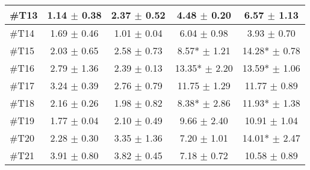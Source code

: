 \begin{longtable} {l|c|c|c|c}
\#T13 & 1.14 $\pm$ 0.38 & 2.37 $\pm$ 0.52 & 4.48 $\pm$ 0.20 & 6.57 $\pm$ 1.13 \\ \hline
\#T14 & 1.69 $\pm$ 0.46 & 1.01 $\pm$ 0.04 & 6.04 $\pm$ 0.98 & 3.93 $\pm$ 0.70 \\ \hline
\#T15 & 2.03 $\pm$ 0.65 & 2.58 $\pm$ 0.73  & 8.57* $\pm$ 1.21 & 14.28* $\pm$ 0.78 \\ \hline
\#T16 & 2.79 $\pm$ 1.36 & 2.39 $\pm$ 0.13 & 13.35* $\pm$ 2.20 & 13.59* $\pm$ 1.06 \\ \hline
\#T17 & 3.24 $\pm$ 0.39  & 2.76 $\pm$ 0.79   & 11.75 $\pm$ 1.29 & 11.77 $\pm$ 0.89 \\ \hline
\#T18 & 2.16 $\pm$ 0.26 & 1.98  $\pm$ 0.82 & 8.38* $\pm$ 2.86 & 11.93* $\pm$ 1.38 \\ \hline
\#T19 & 1.77 $\pm$ 0.04 & 2.10 $\pm$ 0.49 & 9.66 $\pm$ 2.40 & 10.91  $\pm$ 1.04 \\ \hline
\#T20 & 2.28 $\pm$ 0.30 & 3.35 $\pm$ 1.36 & 7.20 $\pm$ 1.01 & 14.01* $\pm$ 2.47 \\ \hline
\#T21 & 3.91 $\pm$ 0.80 &  3.82 $\pm$ 0.45 & 7.18 $\pm$ 0.72 & 10.58 $\pm$ 0.89 \\ \hline
\end{longtable}
\vspace{-.5cm}

\newpage
	
